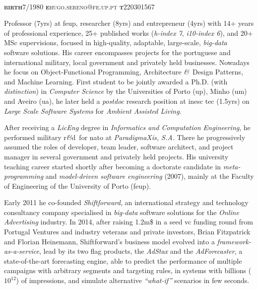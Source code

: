 \documentclass[9pt, a4paper, pstricks]{article}
\newcommand{\amper}{{\fontspec[Scale=.95]{Hoefler Text}\selectfont\itshape\&}}
\newcommand{\years}[1]{\marginnote{\small #1}}
\newcommand{\marginimage}{
}
\newcommand{\acr}[1]{{\sc #1}}
\newcommand{\rnd}{{\sc r\amper d}~}
\begin{document}

{\huge\sc{}}\\
{\small {\scshape  {\bfseries birth}\hspace{2mm}7/1980 \hspace{8mm} {\bfseries e}\hspace{2mm}hugo.sereno@fe.up.pt \hspace{8mm} {\bfseries t}\hspace{2mm}220301567}}\\

\years{\vspace{-4mm}\\\hspace*{-10mm}\texttt{[image: qrcode.eps]}}\marginimage{\small Professor (7yrs) at {\sc feup}, researcher (8yrs) and entrepreneur (4yrs) with 14+ years of professional experience, 25+ published works (\emph{h-index 7}, \emph{i10-index 6}), and 20+ MSc supervisions, focused in high-quality, adaptable, large-scale, \emph{big-data} software solutions. His career encompasses projects for the portuguese and international military, local government and privately held businesses. Nowadays he focus on Object-Functional Programming, Architecture \amper~Design Patterns, and Machine Learning. First student to be jointly awarded a Ph.D. (with \emph{distinction}) in \emph{Computer Science} by the Universities of Porto {\sc (up)}, Minho {\sc (um)} and Aveiro {\sc (ua)}, he later held a \emph{postdoc} research position at \acr{inesc tec} (1.5yrs) on \emph{Large Scale Software Systems} for \emph{Ambient Assisted Living}.

\vspace{1mm}After receiving a \emph{LicEng} degree in \emph{Informatics and Computation Engineering}, he performed military \rnd for \acr{nato} at \emph{ParadigmaXis, S.A.} There he progressively assumed the roles of developer, team leader, software architect, and project manager in several government and privately held projects. His university teaching career started shortly after becoming a doctorate candidate in \emph{meta-programming} and \emph{model-driven software engineering} (2007), mainly at the Faculty of Engineering of the University of Porto (\acr{feup}).

\vspace{1mm}Early 2011 he co-founded \emph{Shiftforward}, an international strategy and technology consultancy company specialised in \emph{big-data} software solutions for the \emph{Online Advertising} industry. In 2014, after raising 1.2{\sc m}\$ in a seed {\sc vc} funding round from Portugal Ventures and industry veterans and private investors, Brian Fitzpatrick and Florian Heinemann, Shiftforward's business model evolved into a \emph{framework-as-a-service}, lead by its two flag products, the \emph{AdStax} and the \emph{AdForecaster}, a state-of-the-art forecasting engine, able to predict the performance of multiple campaigns with arbitrary segments and targeting rules, in systems with billions ($10^{12}$) of impressions, and simulate alternative \emph{``what-if''} scenarios in few seconds.}
\end{document}
